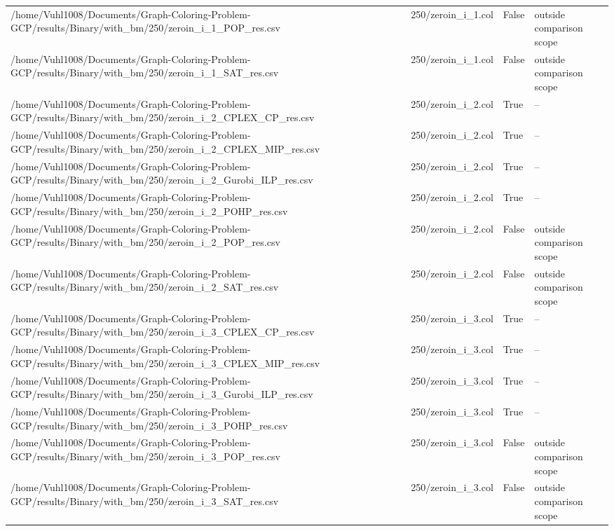 \begin{table}[htbp]
\begin{tabular}{llll}
/home/Vuhl1008/Documents/Graph-Coloring-Problem-GCP/results/Binary/with\_bm/250/zeroin\_i\_1\_POP\_res.csv & 250/zeroin\_i\_1.col & False & outside comparison scope \\
/home/Vuhl1008/Documents/Graph-Coloring-Problem-GCP/results/Binary/with\_bm/250/zeroin\_i\_1\_SAT\_res.csv & 250/zeroin\_i\_1.col & False & outside comparison scope \\
/home/Vuhl1008/Documents/Graph-Coloring-Problem-GCP/results/Binary/with\_bm/250/zeroin\_i\_2\_CPLEX\_CP\_res.csv & 250/zeroin\_i\_2.col & True & -- \\
/home/Vuhl1008/Documents/Graph-Coloring-Problem-GCP/results/Binary/with\_bm/250/zeroin\_i\_2\_CPLEX\_MIP\_res.csv & 250/zeroin\_i\_2.col & True & -- \\
/home/Vuhl1008/Documents/Graph-Coloring-Problem-GCP/results/Binary/with\_bm/250/zeroin\_i\_2\_Gurobi\_ILP\_res.csv & 250/zeroin\_i\_2.col & True & -- \\
/home/Vuhl1008/Documents/Graph-Coloring-Problem-GCP/results/Binary/with\_bm/250/zeroin\_i\_2\_POHP\_res.csv & 250/zeroin\_i\_2.col & True & -- \\
/home/Vuhl1008/Documents/Graph-Coloring-Problem-GCP/results/Binary/with\_bm/250/zeroin\_i\_2\_POP\_res.csv & 250/zeroin\_i\_2.col & False & outside comparison scope \\
/home/Vuhl1008/Documents/Graph-Coloring-Problem-GCP/results/Binary/with\_bm/250/zeroin\_i\_2\_SAT\_res.csv & 250/zeroin\_i\_2.col & False & outside comparison scope \\
/home/Vuhl1008/Documents/Graph-Coloring-Problem-GCP/results/Binary/with\_bm/250/zeroin\_i\_3\_CPLEX\_CP\_res.csv & 250/zeroin\_i\_3.col & True & -- \\
/home/Vuhl1008/Documents/Graph-Coloring-Problem-GCP/results/Binary/with\_bm/250/zeroin\_i\_3\_CPLEX\_MIP\_res.csv & 250/zeroin\_i\_3.col & True & -- \\
/home/Vuhl1008/Documents/Graph-Coloring-Problem-GCP/results/Binary/with\_bm/250/zeroin\_i\_3\_Gurobi\_ILP\_res.csv & 250/zeroin\_i\_3.col & True & -- \\
/home/Vuhl1008/Documents/Graph-Coloring-Problem-GCP/results/Binary/with\_bm/250/zeroin\_i\_3\_POHP\_res.csv & 250/zeroin\_i\_3.col & True & -- \\
/home/Vuhl1008/Documents/Graph-Coloring-Problem-GCP/results/Binary/with\_bm/250/zeroin\_i\_3\_POP\_res.csv & 250/zeroin\_i\_3.col & False & outside comparison scope \\
/home/Vuhl1008/Documents/Graph-Coloring-Problem-GCP/results/Binary/with\_bm/250/zeroin\_i\_3\_SAT\_res.csv & 250/zeroin\_i\_3.col & False & outside comparison scope \\

\end{tabular}
\end{table}
